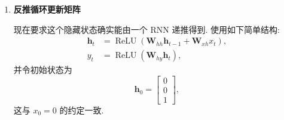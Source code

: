 \documentclass{../nndlcourse}
\begin{document}
\begin{enumerate}
    若输出层写成 RNN 的标准形式
    \begin{equation*}
      y_t
      = \operatorname{ReLU}\left(
          \boldsymbol{W}_{hy}\boldsymbol{h}_t
        \right)
      = \operatorname{ReLU}\left(x_t + x_{t-1} - 1\right),
    \end{equation*}
    那么隐藏状态 $\boldsymbol{h}_t$ 至少要让输出层读到三项信息: 当前输入 $x_t$, 上一时刻输入 $x_{t-1}$, 以及一个常数 1 用来产生 $-1$ 这个偏置. 因此最直接的选择是
    \begin{equation*}
      \boldsymbol{h}_t =
      \begin{bmatrix}
        x_t \\
        x_{t-1} \\
        1
      \end{bmatrix},
      \quad
      \boldsymbol{W}_{hy} =
      \begin{bmatrix}
        1 & 1 & -1
      \end{bmatrix}.
    \end{equation*}
    这里第 1 个隐藏单元保存当前输入, 第 2 个隐藏单元保存上一步输入, 第 3 个隐藏单元始终为 1. 这一维常数状态相当于把输出层的偏置合并进矩阵乘法.

  \item \textbf{反推循环更新矩阵}

    现在要求这个隐藏状态确实能由一个 RNN 递推得到. 使用如下简单结构:
    \begin{align*}
      \boldsymbol{h}_t
      &= \operatorname{ReLU}\left(\boldsymbol{W}_{hh}\boldsymbol{h}_{t-1}
         + \boldsymbol{W}_{xh}x_t\right), \\
      y_t
      &= \operatorname{ReLU}\left(\boldsymbol{W}_{hy}\boldsymbol{h}_t\right),
    \end{align*}
    并令初始状态为
    \begin{equation*}
      \boldsymbol{h}_0 =
      \begin{bmatrix}
        0 \\
        0 \\
        1
      \end{bmatrix},
    \end{equation*}
    这与 $x_0=0$ 的约定一致.


\end{enumerate}
\end{document}
